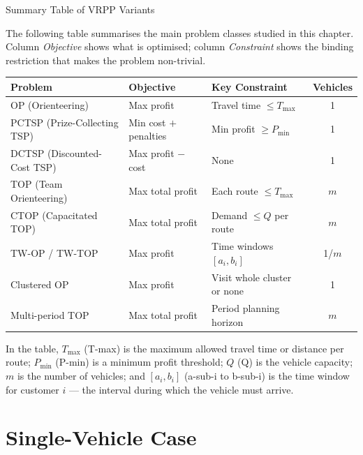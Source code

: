 \documentclass[aspectratio=169,10pt]{beamer}
\begin{document}
\begin{frame}[allowframebreaks]{Summary Table of VRPP Variants}

  The following table summarises the main problem classes studied in this
  chapter.
  Column \emph{Objective} shows what is optimised;
  column \emph{Constraint} shows the binding restriction that makes the
  problem non-trivial.

  \medskip
  \begin{center}
  \small
  \begin{tabular}{lllc}
    \toprule
    \textbf{Problem} & \textbf{Objective} & \textbf{Key Constraint} & \textbf{Vehicles} \\
    \midrule
    OP  (Orienteering)           & Max profit       & Travel time $\le T_{\max}$  & 1  \\
    PCTSP (Prize-Collecting TSP) & Min cost $+$ penalties & Min profit $\ge P_{\min}$ & 1  \\
    DCTSP (Discounted-Cost TSP)  & Max profit $-$ cost  & None                    & 1  \\
    TOP  (Team Orienteering)     & Max total profit & Each route $\le T_{\max}$   & $m$  \\
    CTOP (Capacitated TOP)       & Max total profit & Demand $\le Q$ per route    & $m$  \\
    TW-OP / TW-TOP               & Max profit       & Time windows $[a_i, b_i]$   & 1/$m$ \\
    Clustered OP                 & Max profit       & Visit whole cluster or none & 1  \\
    Multi-period TOP             & Max total profit & Period planning horizon      & $m$  \\
    \bottomrule
  \end{tabular}
  \end{center}

  \medskip
  In the table, $T_{\max}$ (T-max) is the maximum allowed travel time or
  distance per route; $P_{\min}$ (P-min) is a minimum profit threshold;
  $Q$ (Q) is the vehicle capacity; $m$ is the number of vehicles;
  and $[a_i, b_i]$ (a-sub-i to b-sub-i) is the time window for customer
  $i$ --- the interval during which the vehicle must arrive.

\end{frame}


\section{Single-Vehicle Case}
\end{document}
